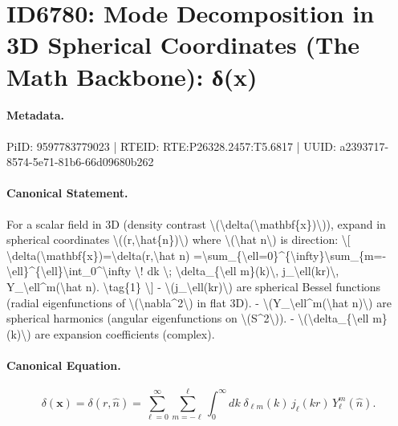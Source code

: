 \section*{ID6780: Mode Decomposition in 3D Spherical Coordinates (The Math Backbone): δ(x)}
\paragraph{Metadata.}
PiID: 9597783779023 | RTEID: RTE:P26328.2457:T5.6817 | UUID: a2393717-8574-5e71-81b6-66d09680b262

\paragraph{Canonical Statement.}
For a scalar field in 3D (density contrast \textbackslash{}(\textbackslash{}delta(\textbackslash{}mathbf\{x\})\textbackslash{})), expand in spherical coordinates \textbackslash{}((r,\textbackslash{}hat\{n\})\textbackslash{}) where \textbackslash{}(\textbackslash{}hat n\textbackslash{}) is direction: \textbackslash{}[ \textbackslash{}delta(\textbackslash{}mathbf\{x\})=\textbackslash{}delta(r,\textbackslash{}hat n) =\textbackslash{}sum\_\{\textbackslash{}ell=0\}\textasciicircum{}\{\textbackslash{}infty\}\textbackslash{}sum\_\{m=-\textbackslash{}ell\}\textasciicircum{}\{\textbackslash{}ell\}\textbackslash{}int\_0\textasciicircum{}\textbackslash{}infty \textbackslash{}! dk \textbackslash{}; \textbackslash{}delta\_\{\textbackslash{}ell m\}(k)\textbackslash{}, j\_\textbackslash{}ell(kr)\textbackslash{}, Y\_\textbackslash{}ell\textasciicircum{}m(\textbackslash{}hat n). \textbackslash{}tag\{1\} \textbackslash{}] - \textbackslash{}(j\_\textbackslash{}ell(kr)\textbackslash{}) are spherical Bessel functions (radial eigenfunctions of \textbackslash{}(\textbackslash{}nabla\textasciicircum{}2\textbackslash{}) in flat 3D). - \textbackslash{}(Y\_\textbackslash{}ell\textasciicircum{}m(\textbackslash{}hat n)\textbackslash{}) are spherical harmonics (angular eigenfunctions on \textbackslash{}(S\textasciicircum{}2\textbackslash{})). - \textbackslash{}(\textbackslash{}delta\_\{\textbackslash{}ell m\}(k)\textbackslash{}) are expansion coefficients (complex).

\paragraph{Canonical Equation.}
\[
\delta(\mathbf{x})=\delta(r,\hat n) =\sum_{\ell=0}^{\infty}\sum_{m=-\ell}^{\ell}\int_0^\infty \! dk \; \delta_{\ell m}(k)\, j_\ell(kr)\, Y_\ell^m(\hat n). \tag{1}
\]

